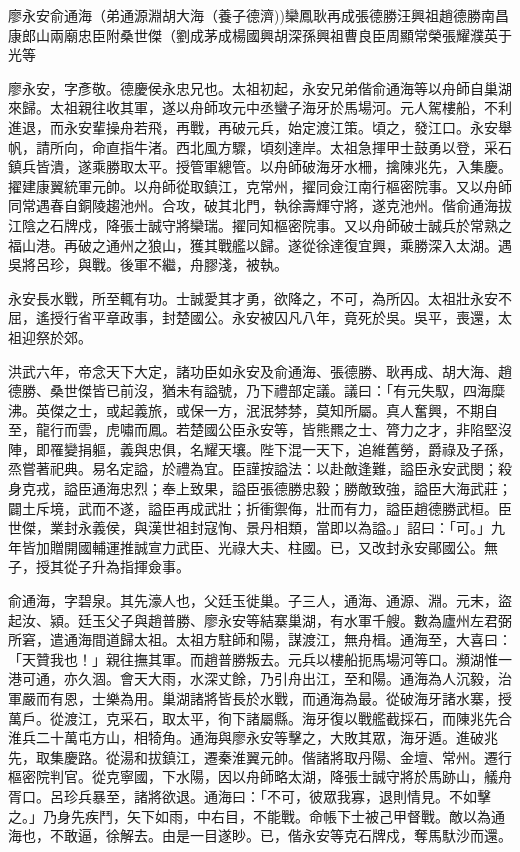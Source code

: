 
\begin{pinyinscope}
廖永安俞通海（弟通源淵胡大海（養子德濟))欒鳳耿再成張德勝汪興祖趙德勝南昌康郎山兩廟忠臣附桑世傑（劉成茅成楊國興胡深孫興祖曹良臣周顯常榮張耀濮英于光等

廖永安，字彥敬。德慶侯永忠兄也。太祖初起，永安兄弟偕俞通海等以舟師自巢湖來歸。太祖親往收其軍，遂以舟師攻元中丞蠻子海牙於馬場河。元人駕樓船，不利進退，而永安輩操舟若飛，再戰，再破元兵，始定渡江策。頃之，發江口。永安舉帆，請所向，命直指牛渚。西北風方驟，頃刻達岸。太祖急揮甲士鼓勇以登，采石鎮兵皆潰，遂乘勝取太平。授管軍總管。以舟師破海牙水柵，擒陳兆先，入集慶。擢建康翼統軍元帥。以舟師從取鎮江，克常州，擢同僉江南行樞密院事。又以舟師同常遇春自銅陵趨池州。合攻，破其北門，執徐壽輝守將，遂克池州。偕俞通海拔江陰之石牌戍，降張士誠守將欒瑞。擢同知樞密院事。又以舟師破士誠兵於常熟之福山港。再破之通州之狼山，獲其戰艦以歸。遂從徐達復宜興，乘勝深入太湖。遇吳將呂珍，與戰。後軍不繼，舟膠淺，被執。

永安長水戰，所至輒有功。士誠愛其才勇，欲降之，不可，為所囚。太祖壯永安不屈，遙授行省平章政事，封楚國公。永安被囚凡八年，竟死於吳。吳平，喪還，太祖迎祭於郊。

洪武六年，帝念天下大定，諸功臣如永安及俞通海、張德勝、耿再成、胡大海、趙德勝、桑世傑皆已前沒，猶未有謚號，乃下禮部定議。議曰：「有元失馭，四海糜沸。英傑之士，或起義旅，或保一方，泯泯棼棼，莫知所屬。真人奮興，不期自至，龍行而雲，虎嘯而鳳。若楚國公臣永安等，皆熊羆之士、膂力之才，非陷堅沒陣，即罹變捐軀，義與忠俱，名耀天壤。陛下混一天下，追維舊勞，爵祿及子孫，烝嘗著祀典。易名定謚，於禮為宜。臣謹按謚法：以赴敵逢難，謚臣永安武閔；殺身克戎，謚臣通海忠烈；奉上致果，謚臣張德勝忠毅；勝敵致強，謚臣大海武莊；闢土斥境，武而不遂，謚臣再成武壯；折衝禦侮，壯而有力，謚臣趙德勝武桓。臣世傑，業封永義侯，與漢世祖封寇恂、景丹相類，當即以為謚。」詔曰：「可。」九年皆加贈開國輔運推誠宣力武臣、光祿大夫、柱國。已，又改封永安鄖國公。無子，授其從子升為指揮僉事。

俞通海，字碧泉。其先濠人也，父廷玉徙巢。子三人，通海、通源、淵。元末，盜起汝、潁。廷玉父子與趙普勝、廖永安等結寨巢湖，有水軍千艘。數為廬州左君弼所窘，遣通海間道歸太祖。太祖方駐師和陽，謀渡江，無舟楫。通海至，大喜曰：「天贊我也！」親往撫其軍。而趙普勝叛去。元兵以樓船扼馬場河等口。瀕湖惟一港可通，亦久涸。會天大雨，水深丈餘，乃引舟出江，至和陽。通海為人沉毅，治軍嚴而有恩，士樂為用。巢湖諸將皆長於水戰，而通海為最。從破海牙諸水寨，授萬戶。從渡江，克采石，取太平，徇下諸屬縣。海牙復以戰艦截採石，而陳兆先合淮兵二十萬屯方山，相犄角。通海與廖永安等擊之，大敗其眾，海牙遁。進破兆先，取集慶路。從湯和拔鎮江，遷秦淮翼元帥。偕諸將取丹陽、金壇、常州。遷行樞密院判官。從克寧國，下水陽，因以舟師略太湖，降張士誠守將於馬跡山，艤舟胥口。呂珍兵暴至，諸將欲退。通海曰：「不可，彼眾我寡，退則情見。不如擊之。」乃身先疾鬥，矢下如雨，中右目，不能戰。命帳下士被己甲督戰。敵以為通海也，不敢逼，徐解去。由是一目遂眇。已，偕永安等克石牌戍，奪馬馱沙而還。


\end{pinyinscope}
